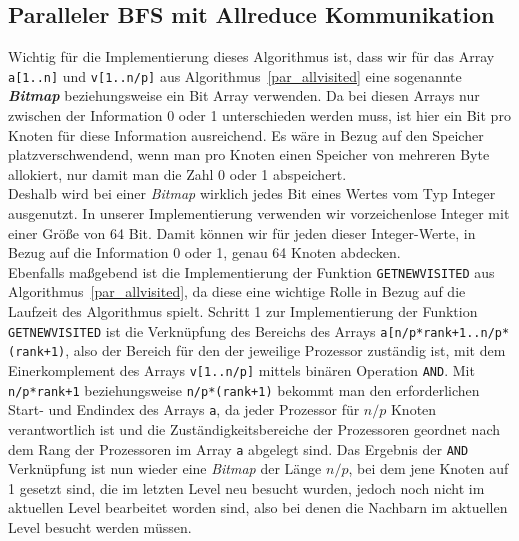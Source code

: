 \documentclass[11pt,a4paper]{article}
\begin{document}
\subsection{Paralleler BFS mit Allreduce Kommunikation}
\label{sec:allreduce_details}
Wichtig für die Implementierung dieses Algorithmus ist, dass wir für das Array \lstinline{a[1..n]} und \lstinline{v[1..n/p]} aus Algorithmus~\ref{par_allvisited} eine sogenannte \textbf{\textit{Bitmap}} beziehungsweise ein Bit Array verwenden. Da bei diesen Arrays nur zwischen der Information 0 oder 1 unterschieden werden muss, ist hier ein Bit pro Knoten für diese Information ausreichend. Es wäre in Bezug auf den Speicher platzverschwendend, wenn man pro Knoten einen Speicher von mehreren Byte allokiert, nur damit man die Zahl 0 oder 1 abspeichert.\\
Deshalb wird bei einer \textit{Bitmap} wirklich jedes Bit eines Wertes vom Typ Integer ausgenutzt. In unserer Implementierung verwenden wir vorzeichenlose Integer mit einer Größe von 64 Bit. Damit können wir für jeden dieser Integer-Werte, in Bezug auf die Information 0 oder 1, genau 64 Knoten abdecken.\\
Ebenfalls maßgebend ist die Implementierung der Funktion \lstinline{GETNEWVISITED} aus Algorithmus~\ref{par_allvisited}, da diese eine wichtige Rolle in Bezug auf die Laufzeit des Algorithmus spielt. Schritt 1 zur Implementierung der Funktion \lstinline{GETNEWVISITED} ist die Verknüpfung des Bereichs des Arrays \lstinline{a[n/p*rank+1..n/p*(rank+1)}, also der Bereich für den der jeweilige Prozessor zuständig ist, mit dem Einerkomplement des Arrays \lstinline{v[1..n/p]} mittels binären Operation \lstinline{AND}. Mit \lstinline{n/p*rank+1} beziehungsweise \lstinline{n/p*(rank+1)} bekommt man den erforderlichen Start- und Endindex des Arrays \lstinline{a}, da jeder Prozessor für \(n/p\) Knoten verantwortlich ist und die Zuständigkeitsbereiche der Prozessoren geordnet nach dem Rang der Prozessoren im Array \lstinline{a} abgelegt sind. Das Ergebnis der \lstinline{AND} Verknüpfung ist nun wieder eine \textit{Bitmap} der Länge \(n/p\), bei dem jene Knoten auf 1 gesetzt sind, die im letzten Level neu besucht wurden, jedoch noch nicht im aktuellen Level bearbeitet worden sind, also bei denen die Nachbarn im aktuellen Level besucht werden müssen. 
\end{document}
